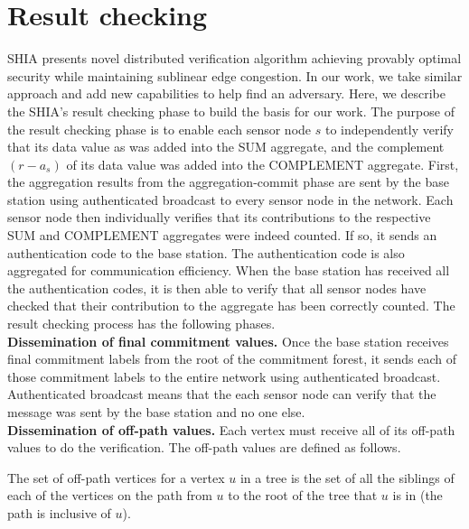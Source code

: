 \section{Result checking} %
\label{sec:result_checking}
	SHIA presents novel distributed verification algorithm achieving provably optimal security while maintaining sublinear edge congestion.
	In our work, we take similar approach and add new capabilities to help find an adversary.
	Here, we describe the SHIA's result checking phase to build the basis for our work.
	The purpose of the result checking phase is to enable each sensor node $s$ to independently verify that its data value as was added into the SUM aggregate, and the complement $(r - a_{s})$ of its data value was added into the COMPLEMENT aggregate. 
	First, the aggregation results from the aggregation-commit phase are sent by the base station using authenticated broadcast to every sensor node in the network.
	Each sensor node then individually verifies that its contributions to the respective SUM and COMPLEMENT aggregates were indeed counted.
	If so, it sends an authentication code to the base station.
	The authentication code is also aggregated for communication efficiency. 
	When the base station has received all the authentication codes, it is then able to verify that all sensor nodes have checked that their contribution to the aggregate has been correctly counted.
	The result checking process has the following phases.\\
	\textbf{Dissemination of final commitment values.}
	Once the base station receives final commitment labels from the root of the commitment forest, it sends each of those commitment labels to the entire network using authenticated broadcast.
	Authenticated broadcast means that the each sensor node can verify that the message was sent by the base station and no one else.\\
	\textbf{Dissemination of off-path values.} 
	Each vertex must receive all of its off-path values to do the verification.
	The off-path values are defined as follows.
	\begin{definition}
		\cite{chan2006secure}
		The set of off-path vertices for a vertex $u$ in a tree is the set of all the siblings of each of the vertices on the path from $u$ to the root of the tree that $u$ is in (the path is inclusive of $u$).
	\end{definition}
